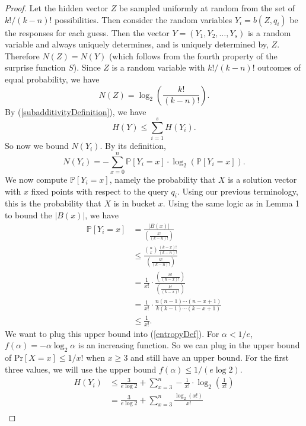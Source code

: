 \documentclass[12pt, a4paper]{article}
\begin{document}
\begin{proof}
	Let the hidden vector $Z$ be sampled uniformly at random from the set of $k!/(k-n)!$ possibilities. Then consider the random variables $Y_i = b(Z, q_i)$ be the responses for each guess. Then the vector $Y = (Y_1, Y_2, \ldots, Y_s)$ is a random variable and always uniquely determines, and is uniquely determined by, $Z$. Therefore $N(Z) = N(Y)$ (which follows from the fourth property of the surprise function $S$). Since $Z$ is a random variable with $k!/(k-n)!$ outcomes of equal probability, we have
	\begin{equation}\label{equalEntropy}
		N(Z) = \log_2\left(\frac{k!}{(k-n)!}\right).
	\end{equation}
	By (\ref{subadditivityDefinition}), we have
	\begin{equation}\label{entropySum}
		H(Y)\le\sum_{i=1}^s H(Y_i).
	\end{equation}
	So now we bound $N(Y_i)$. By its definition,
	\begin{equation}\label{entropyDef}
		N(Y_i)=-\sum_{x=0}^n \mathbb{P}[Y_i=x]\cdot\log_2(\mathbb{P}[Y_{i}=x]).
	\end{equation}
	We now compute $\mathbb{P}[Y_i=x]$, namely the probability that $X$ is a solution vector with $x$ fixed points with respect to the query $q_i$. Using our previous terminology, this is the probability that $X$ is in bucket $x$.
	Using the same logic as in Lemma 1 to bound the $|B(x)|$, we have
	\begin{align*}
		\mathbb{P}[Y_i = x] &= \frac{|B(x)|}{\left(\frac{k!}{(k-n)!}\right)}\\
		&\leq \frac{\binom{n}{x}\frac{(k-x)!}{(k-n)!}}{\left(\frac{k!}{(k-n)!}\right)}\\
		& = \frac{1}{x!}\cdot
		\frac{\left(\frac{n!}{(n-x)!}\right)}{\left(\frac{k!}{(k-x)!}\right)}\\
		&= \frac{1}{x!}\cdot\frac{n(n-1)\cdots(n-x+1)}{k(k-1)\cdots(k-x+1)}\\
		&\leq \frac{1}{x!}.
	\end{align*}
	We want to plug this upper bound into (\ref{entropyDef}). For $\alpha<1/e$, $f(\alpha)=-\alpha\log_2\alpha$ is an increasing function. So we can plug in the upper bound of $\text{Pr}[X=x]\le 1/x!$ when $x\ge 3$ and still have an upper bound. For the first three values, we will use the upper bound $f(\alpha)\le 1/(e\log 2)$. 
	\begin{align*}
		H(Y_i) &\leq \frac{3}{e\log 2}+\sum_{x=3}^n-\frac{1}{x!}\cdot\log_2(\frac{1}{x!})\\
		&= \frac{3}{e\log 2}+\sum_{x=3}^n \frac{\log_2(x!)}{x!}\\

\end{align*}
\end{proof}
\end{document}
